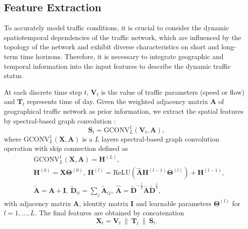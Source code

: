 \documentclass[letterpaper, 10 pt, conference]{ieeeconf}
\newcommand{\revise}[1]{{\color{black}{#1}}}
\begin{document}
\subsection{Feature Extraction}

To accurately model traffic conditions, it is crucial to consider the dynamic spatiotemporal dependencies of the traffic network, which are influenced by the topology of the network and exhibit diverse characteristics on short and long-term time horizons. Therefore, it is necessary to integrate geographic and temporal information into the input features to describe the dynamic traffic status.


At each discrete time step $t$, $\mathbf{V}_t$ is the value of traffic parameters (speed or flow) and $\mathbf{T}_t$ represents time of day. Given the weighted adjacency matrix $\mathbf{A}$ of geographical traffic network as prior information, we extract the spatial features by spectral-based graph convolution \cite{kipf2016semi}:
\begin{equation}
        \label{eq:fe_geo}
        \mathbf{S}_t=\text{GCONV}^{1}_L(\mathbf{V}_t,\mathbf{A}),
\end{equation}
where $\text{GCONV}^1_L(\mathbf{X},\mathbf{A})$ is a $L$ layers spectral-based graph convolution operation with skip connection defined as
\vspace{-2pt}
\begin{equation}
        \label{eq:def_gconv}
        \begin{aligned}
                &\text{GCONV}^1_L(\mathbf{X},\mathbf{A})=\mathbf{H}^{(L)},\\
                &\mathbf{H}^{(0)}=\mathbf{X}\mathbf{\Theta}^{(0)},\ \mathbf{H}^{(l)}=\text{ReLU}(\hat{\mathbf{A}}\mathbf{H}^{(l-1)}\mathbf{\Theta}^{(l)})+\mathbf{H}^{(l-1)},\\
                &\tilde{\mathbf{A}}=\mathbf{A}+\mathbf{I},\ \tilde{\mathbf{D}}_{ii}=\sum_j\tilde{\mathbf{A}}_{ij},\ \hat{\mathbf{A}}=\tilde{\mathbf{D}}^{-\frac{1}{2}}\tilde{\mathbf{A}}\tilde{\mathbf{D}}^{\frac{1}{2}},
        \end{aligned}
\end{equation}
with adjacency matrix $\mathbf{A}$, identity matrix $\mathbf{I}$ and learnable parameters $\mathbf{\Theta}^{(l)}$ for $l=1,...,L$. The final features are obtained by concatenation
\begin{equation}
        \mathbf{X}_t=\mathbf{V}_t\ \|\ \mathbf{T}_t\ \|\ \mathbf{S}_t.
\end{equation}
\revise{where concatenation operator $||$ represents joining two matrices or tensors along the last dimension.} 
\end{document}
